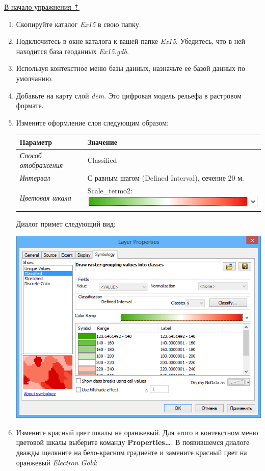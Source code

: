 \documentclass[]{book}
\theoremstyle{definition}
\theoremstyle{definition}
\theoremstyle{definition}
\theoremstyle{remark}
\begin{document}
\protect\hyperlink{dem}{В начало упражнения ⇡}

\begin{enumerate}
\def\labelenumi{\arabic{enumi}.}
\item
  Скопируйте каталог \emph{Ex15} в свою папку.
\item
  Подключитесь в окне каталога к вашей папке \emph{Ex15}. Убедитесь, что
  в ней находится база геоданных \emph{Ex15.gdb}.
\item
  Используя контекстное меню базы данных, назначьте ее базой данных по
  умолчанию.
\item
  Добавьте на карту слой \emph{dem}. Это цифровая модель рельефа в
  растровом формате.
\item
  Измените оформление слоя следующим образом:

  \begin{longtable}[]{@{}ll@{}}
  \toprule
  Параметр & Значение\tabularnewline
  \midrule
  \endhead
  \emph{Способ отображения} & Classified\tabularnewline
  \emph{Интервал} & С равным шагом (Defined Interval), сечение 20
  м.\tabularnewline
  \emph{Цветовая шкала} & Scale\_termo2:
  \includegraphics{images/Ex15/image7.png}\tabularnewline
  \bottomrule
  \end{longtable}

  Диалог примет следующий вид:

  \includegraphics{images/Ex15/image8.png}
\item
  Измените красный цвет шкалы на оранжевый. Для этого в контекстном меню
  цветовой шкалы выберите команду \textbf{Properties\ldots{}}. В
  появившемся диалоге дважды щелкните на бело-красном градиенте и
  замените красный цвет на оранжевый \emph{Electron Gold}:


\end{enumerate}
\end{document}
